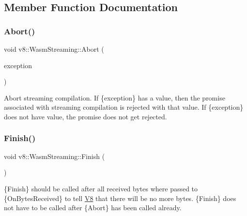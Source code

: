\subsection{Member Function Documentation}
\mbox{\label{classv8_1_1WasmStreaming_aca7399d97368360079e3030b2fb4fc94}} 
\subsubsection{\texorpdfstring{Abort()}{Abort()}}
{\footnotesize\ttfamily void v8\+::\+Wasm\+Streaming\+::\+Abort (\begin{DoxyParamCaption}\item[{\mbox{\hyperlink{classv8_1_1MaybeLocal}{Maybe\+Local}}$<$ \mbox{\hyperlink{classv8_1_1Value}{Value}} $>$}]{exception }\end{DoxyParamCaption})}

Abort streaming compilation. If \{exception\} has a value, then the promise associated with streaming compilation is rejected with that value. If \{exception\} does not have value, the promise does not get rejected. \mbox{\label{classv8_1_1WasmStreaming_a2c40c85c34643af871577ea98d792de6}} 
\subsubsection{\texorpdfstring{Finish()}{Finish()}}
{\footnotesize\ttfamily void v8\+::\+Wasm\+Streaming\+::\+Finish (\begin{DoxyParamCaption}{ }\end{DoxyParamCaption})}

\{Finish\} should be called after all received bytes where passed to \{On\+Bytes\+Received\} to tell \mbox{\hyperlink{classv8_1_1V8}{V8}} that there will be no more bytes. \{Finish\} does not have to be called after \{Abort\} has been called already. \mbox{\label{classv8_1_1WasmStreaming_ada886a06f191ac65897763bda60c2f54}} 

